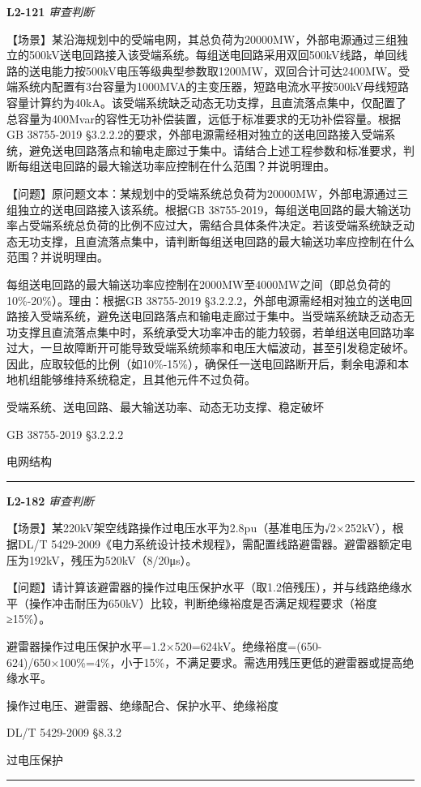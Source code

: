 \documentclass[12pt,a4paper]{ctexart}
\begin{document}
\noindent\textbf{L2-121} \hfill \textit{审查判断}
\begin{description}[leftmargin=1.5em,style=nextline,font=\normalfont]
  \item[Q:] 【场景】某沿海规划中的受端电网，其总负荷为20000MW，外部电源通过三组独立的500kV送电回路接入该受端系统。每组送电回路采用双回500kV线路，单回线路的送电能力按500kV电压等级典型参数取1200MW，双回合计可达2400MW。受端系统内配置有3台容量为1000MVA的主变压器，短路电流水平按500kV母线短路容量计算约为40kA。该受端系统缺乏动态无功支撑，且直流落点集中，仅配置了总容量为400Mvar的容性无功补偿装置，远低于标准要求的无功补偿容量。根据GB 38755-2019 §3.2.2.2的要求，外部电源需经相对独立的送电回路接入受端系统，避免送电回路落点和输电走廊过于集中。请结合上述工程参数和标准要求，判断每组送电回路的最大输送功率应控制在什么范围？并说明理由。

【问题】原问题文本：某规划中的受端系统总负荷为20000MW，外部电源通过三组独立的送电回路接入该系统。根据GB 38755-2019，每组送电回路的最大输送功率占受端系统总负荷的比例不应过大，需结合具体条件决定。若该受端系统缺乏动态无功支撑，且直流落点集中，请判断每组送电回路的最大输送功率应控制在什么范围？并说明理由。
  \item[A:] 每组送电回路的最大输送功率应控制在2000MW至4000MW之间（即总负荷的10\%-20\%）。理由：根据GB 38755-2019 §3.2.2.2，外部电源需经相对独立的送电回路接入受端系统，避免送电回路落点和输电走廊过于集中。当受端系统缺乏动态无功支撑且直流落点集中时，系统承受大功率冲击的能力较弱，若单组送电回路功率过大，一旦故障断开可能导致受端系统频率和电压大幅波动，甚至引发稳定破坏。因此，应取较低的比例（如10\%-15\%），确保任一送电回路断开后，剩余电源和本地机组能够维持系统稳定，且其他元件不过负荷。
  \item[KW:] 受端系统、送电回路、最大输送功率、动态无功支撑、稳定破坏
  \item[Std:] GB 38755-2019 §3.2.2.2
  \item[Topic:] 电网结构
\end{description}
\vspace{4pt}
\hrule\vspace{6pt}

\noindent\textbf{L2-182} \hfill \textit{审查判断}
\begin{description}[leftmargin=1.5em,style=nextline,font=\normalfont]
  \item[Q:] 【场景】某220kV架空线路操作过电压水平为2.8pu（基准电压为√2×252kV），根据DL/T 5429-2009《电力系统设计技术规程》，需配置线路避雷器。避雷器额定电压为192kV，残压为520kV（8/20μs）。

【问题】请计算该避雷器的操作过电压保护水平（取1.2倍残压），并与线路绝缘水平（操作冲击耐压为650kV）比较，判断绝缘裕度是否满足规程要求（裕度≥15\%）。
  \item[A:] 避雷器操作过电压保护水平=1.2×520=624kV。绝缘裕度=(650-624)/650×100\%=4\%，小于15\%，不满足要求。需选用残压更低的避雷器或提高绝缘水平。
  \item[KW:] 操作过电压、避雷器、绝缘配合、保护水平、绝缘裕度
  \item[Std:] DL/T 5429-2009 §8.3.2
  \item[Topic:] 过电压保护
\end{description}
\vspace{4pt}
\hrule\vspace{6pt}
\end{document}
